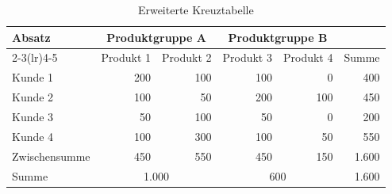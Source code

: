 \begin{table}[htbp]
  \centering
  \caption{Erweiterte Kreuztabelle}
  \label{tab:3-3}
  \small
  \setlength{\tabcolsep}{4pt}
  \begin{tabular}{lrrrrr}
    \toprule
    Absatz & \multicolumn{2}{c}{Produktgruppe A} & \multicolumn{2}{c}{Produktgruppe B} & \\
    \cmidrule(lr){2-3}\cmidrule(lr){4-5}
     & Produkt 1 & Produkt 2 & Produkt 3 & Produkt 4 & Summe \\
    \midrule
    Kunde 1 & 200 & 100 & 100 & 0 & 400 \\
    Kunde 2 & 100 & 50 & 200 & 100 & 450 \\
    Kunde 3 & 50 & 100 & 50 & 0 & 200 \\
    Kunde 4 & 100 & 300 & 100 & 50 & 550 \\
    \midrule
    Zwischensumme & 450 & 550 & 450 & 150 & 1.600 \\
    Summe & \multicolumn{2}{c}{1.000} & \multicolumn{2}{c}{600} & 1.600 \\
    \bottomrule
  \end{tabular}
\end{table}
